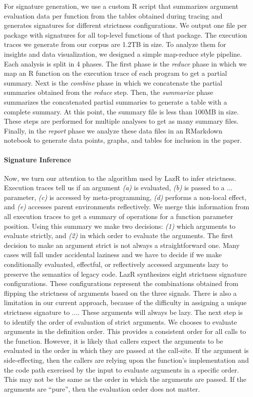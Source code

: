 \documentclass[review,nonacm,screen,acmsmall,anonymous=true]{acmart}
\newcommand{\lazr}{{\sf LazR}\xspace}
\begin{document}
For signature generation, we use a custom R script that summarizes argument
evaluation data per function from the tables obtained during tracing and
generates signatures for different strictness configurations. We output one file
per package with signatures for all top-level functions of that package.
The execution traces we generate from our corpus are 1.2TB in size. To analyze
them for insights and data visualization, we designed a simple map-reduce style
pipeline. Each analysis is split in 4 phases. The first phase is the
\emph{reduce} phase in which we map an R function on the execution trace of each
program to get a partial summary. Next is the \emph{combine} phase in which we
concatenate the partial summaries obtained from the \emph{reduce} step. Then,
the \emph{summarize} phase summarizes the concatenated partial summaries to
generate a table with a complete summary. At this point, the summary file is
less than 100MB in size. These steps are performed for multiple analyses to get
as many summary files. Finally, in the \emph{report} phase we analyze these data
files in an RMarkdown notebook to generate data points, graphs, and tables for
inclusion in the paper.

\paragraph{Signature Inference}

Now, we turn our attention to the algorithm used by \lazr to infer strictness.
Execution traces tell us if an argument \emph{(a)} is
evaluated, \emph{(b)} is passed to a $...$ parameter, \emph{(c)} is
accessed by meta-programming, \emph{(d)} performs a non-local effect, and \emph{(e)} accesses
parent environments reflectively. We merge this information from all
execution traces to get a summary of operations for a function parameter
position. Using this summary we make two decisions: \emph{(1)} which
arguments to evaluate strictly, and \emph{(2)} in which order to evaluate the arguments.
The first decision to make an argument strict is not always a straightforward
one. Many cases will fall under accidental laziness and we have to decide
if we make conditionally evaluated, effectful, or reflectively accessed
arguments lazy to preserve the semantics of legacy code.
\lazr synthesizes eight strictness signature configurations.
These configurations represent the combinations obtained
from flipping the strictness of arguments based on the three signals.
There is also a
limitation in our current approach, because of the difficulty in assigning a
unique strictness signature to $...$. These arguments will always be lazy.
The next step is to identify the order of evaluation of strict arguments. We
chooses to evaluate arguments in the definition order. This provides a
consistent order for all calls to the function. However, it is likely that
callers expect the arguments to be evaluated in the order in which they are
passed at the call-site. If the argument is side-effecting, then the callers are
relying upon the function's implementation and the code path exercised by the
input to evaluate arguments in a specific order. This may not be the same as the
order in which the arguments are passed. If the arguments are ``pure'', then the
evaluation order does not matter.
\end{document}
